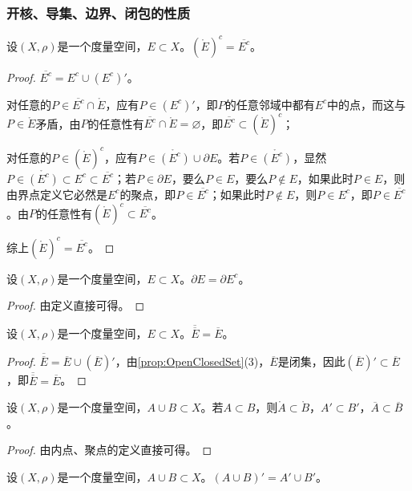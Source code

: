 \subsubsection{开核、导集、边界、闭包的性质}
\begin{theorem}
	设$(X,\rho)$是一个度量空间，$E\subset X$。$(\mathring{E})^c=\overline{E^c}$。
\end{theorem}
\begin{proof}
	$\overline{E^c}=E^c\cup (E^c)'$。\par
	对任意的$ P\in\overline{E^c}\cap\mathring{E}$，应有$P\in(E^c)'$，即$P$的任意邻域中都有$E^c$中的点，而这与$P\in\mathring{E}$矛盾，由$P$的任意性有$\overline{E^c}\cap\mathring{E}=\varnothing$，即$\overline{E^c}\subset(\mathring{E})^c$；\par
	对任意的$ P\in(\mathring{E})^c$，应有$P\in\mathring{(E^c)}\cup\partial E$。若$P\in\mathring{(E^c)}$，显然$P\in\mathring{(E^c)}\subset E^c\subset\overline{E^c}$；若$P\in\partial E$，要么$P\in E$，要么$P\notin E$，如果此时$P\in E$，则由界点定义它必然是$E^c$的聚点，即$P\in \overline{E^c}$；如果此时$P\notin E$，则$P\in E^c$，即$P\in \overline{E^c}$。由$P$的任意性有$(\mathring{E})^c\subset\overline{E^c}$。\par
	综上$(\mathring{E})^c=\overline{E^c}$。
\end{proof}
\begin{theorem}
	设$(X,\rho)$是一个度量空间，$E\subset X$。$\partial E = \partial E^c$。
\end{theorem}
\begin{proof}
	由定义直接可得。
\end{proof}
\begin{theorem}
	设$(X,\rho)$是一个度量空间，$E\subset X$。$\overline{\overline E}=\overline{E}$。
\end{theorem}
\begin{proof}
	$\overline{\overline E}=\overline{E}\cup (\overline{E})'$，由\cref{prop:OpenClosedSet}(3)，$\overline{E}$是闭集，因此$(\overline{E})'\subset\overline{E}$，即$\overline{\overline E}=\overline{E}$。
\end{proof}
\begin{theorem}\label{theo:subsetilc}
	设$(X,\rho)$是一个度量空间，$A\cup B\subset X$。若$A\subset B$，则$\mathring{A}\subset\mathring{B}$，$A'\subset B'$，$\overline{A}\subset\overline{B}$。
\end{theorem}
\begin{proof}
	由内点、聚点的定义直接可得。
\end{proof}
\begin{theorem}\label{theo:cuplimitset eq2 limitsetcup}
	设$(X,\rho)$是一个度量空间，$A\cup B\subset X$。$(A\cup B)'=A'\cup B'$。
\end{theorem}
